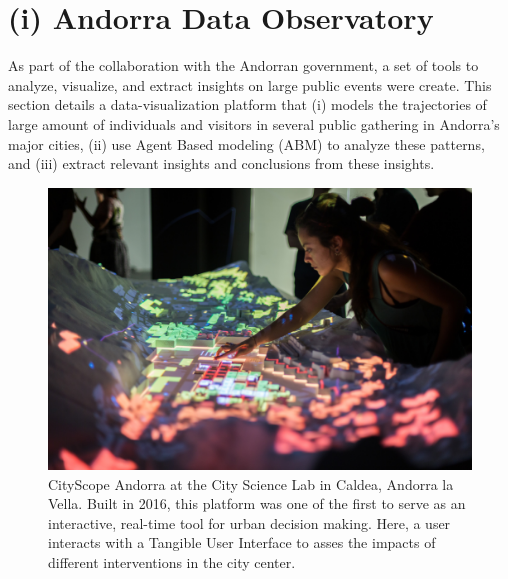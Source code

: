 \section{(i) Andorra Data Observatory}\label{sec:andorra-data-observatory}
{
    As part of the collaboration with the Andorran government, a set of tools to analyze, visualize, and extract insights on large public events were create. This section details a data-visualization platform that (i) models the trajectories of large amount of individuals and visitors in several public gathering in Andorra's major cities, (ii) use Agent Based modeling (ABM) to analyze these patterns, and (iii) extract relevant insights and conclusions from these insights.

    \begin{figure}[h]
        \begin{center}
            \includegraphics[width=1\textwidth]{chapters/insight/and_abm/figures/and_cityscope.jpg}
        \end{center}
        \caption{CityScope Andorra at the City Science Lab in Caldea, Andorra la Vella. Built in 2016, this platform was one of the first to serve as an interactive, real-time tool for urban decision making. Here, a user interacts with a Tangible User Interface to asses the impacts of different interventions in the city center.}
        \label{fig:and_cityscope}
    \end{figure}

}
